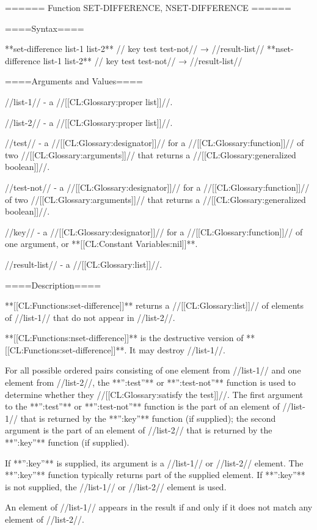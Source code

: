 ====== Function SET-DIFFERENCE, NSET-DIFFERENCE ======

====Syntax====

**set-difference {list-1 list-2** //\key} key test test-not// → //result-list// **nset-difference {list-1 list-2** //\key} key test test-not// → //result-list//

====Arguments and Values====

//list-1// - a //[[CL:Glossary:proper list]]//.

//list-2// - a //[[CL:Glossary:proper list]]//.

//test// - a //[[CL:Glossary:designator]]// for a //[[CL:Glossary:function]]// of two //[[CL:Glossary:arguments]]// that returns a //[[CL:Glossary:generalized boolean]]//.

//test-not// - a //[[CL:Glossary:designator]]// for a //[[CL:Glossary:function]]// of two //[[CL:Glossary:arguments]]// that returns a //[[CL:Glossary:generalized boolean]]//.

//key// - a //[[CL:Glossary:designator]]// for a //[[CL:Glossary:function]]// of one argument, or **[[CL:Constant Variables:nil]]**.

//result-list// - a //[[CL:Glossary:list]]//.

====Description====

**[[CL:Functions:set-difference]]** returns a //[[CL:Glossary:list]]// of elements of //list-1// that do not appear in //list-2//.

**[[CL:Functions:nset-difference]]** is the destructive version of **[[CL:Functions:set-difference]]**. It may destroy //list-1//.

For all possible ordered pairs consisting of one element from //list-1// and one element from //list-2//, the **'':test''** or **'':test-not''** function is used to determine whether they //[[CL:Glossary:satisfy the test]]//. The first argument to the **'':test''** or **'':test-not''** function is the part of an element of //list-1// that is returned by the **'':key''** function (if supplied); the second argument is the part of an element of //list-2// that is returned by the **'':key''** function (if supplied).

If **'':key''** is supplied, its argument is a //list-1// or //list-2// element. The **'':key''** function typically returns part of the supplied element. If **'':key''** is not supplied, the //list-1// or //list-2// element is used.

An element of //list-1// appears in the result if and only if it does not match any element of //list-2//.

